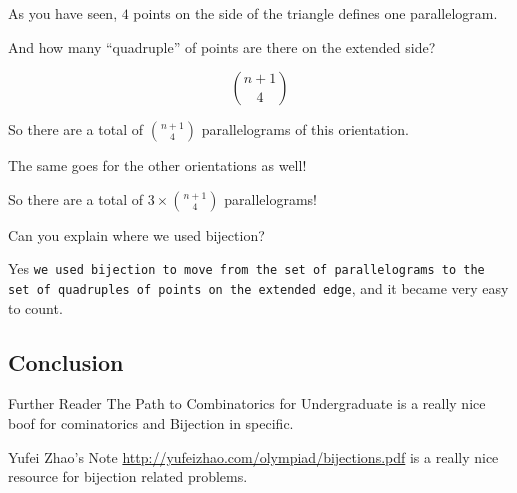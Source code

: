 \documentclass[compress]{beamer}
\begin{document}
\begin{frame}
    As you have seen, $4$ points on the side of the triangle defines one
    parallelogram. 

    \pause\vspace{1em}

    And how many ``quadruple'' of points are there on the extended side?

    \pause\vspace{1em}

    \textcolor{NordRed}{
        \[\boxed{{n+1 \choose 4}}\]
    }

    \pause\vspace{1em}

    So there are a total of ${n+1 \choose 4}$ parallelograms of this
    orientation. 

    \pause\vspace{1em}

    The same goes for the other orientations as well!
\end{frame}

\begin{frame}
    So there are a total of $3\times {n+1 \choose 4}$ parallelograms!

    \pause\vspace{1em}

    Can you explain where we used bijection?

    \pause\vspace{1em}

    Yes \texttt{we used bijection to move from the set of parallelograms to the set of
    quadruples of points on the extended edge}, and it became very easy to
    count.
\end{frame}


\subsection{Conclusion}

\begin{frame}{Further Reader}
    \textcolor{NordOrange}{The Path to Combinatorics for Undergraduate} is a
    really nice boof for cominatorics and Bijection in specific.


    \pause\vspace{1em}

    \textcolor{NordOrange}{Yufei Zhao's Note}
    \url{http://yufeizhao.com/olympiad/bijections.pdf} is a really nice
    resource for bijection related problems.
\end{frame}
\end{document}
